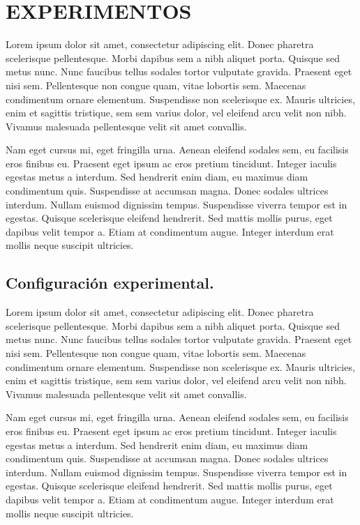 \section{EXPERIMENTOS}
Lorem ipsum dolor sit amet, consectetur adipiscing elit. Donec pharetra scelerisque pellentesque. Morbi dapibus sem a nibh aliquet porta. Quisque sed metus nunc. Nunc faucibus tellus sodales tortor vulputate gravida. Praesent eget nisi sem. Pellentesque non congue quam, vitae lobortis sem. Maecenas condimentum ornare elementum. Suspendisse non scelerisque ex. Mauris ultricies, enim et sagittis tristique, sem sem varius dolor, vel eleifend arcu velit non nibh. Vivamus malesuada pellentesque velit sit amet convallis.

Nam eget cursus mi, eget fringilla urna. Aenean eleifend sodales sem, eu facilisis eros finibus eu. Praesent eget ipsum ac eros pretium tincidunt. Integer iaculis egestas metus a interdum. Sed hendrerit enim diam, eu maximus diam condimentum quis. Suspendisse at accumsan magna. Donec sodales ultrices interdum. Nullam euismod dignissim tempus. Suspendisse viverra tempor est in egestas. Quisque scelerisque eleifend hendrerit. Sed mattis mollis purus, eget dapibus velit tempor a. Etiam at condimentum augue. Integer interdum erat mollis neque suscipit ultricies.



\subsection{Configuración experimental.}

Lorem ipsum dolor sit amet, consectetur adipiscing elit. Donec pharetra scelerisque pellentesque. Morbi dapibus sem a nibh aliquet porta. Quisque sed metus nunc. Nunc faucibus tellus sodales tortor vulputate gravida. Praesent eget nisi sem. Pellentesque non congue quam, vitae lobortis sem. Maecenas condimentum ornare elementum. Suspendisse non scelerisque ex. Mauris ultricies, enim et sagittis tristique, sem sem varius dolor, vel eleifend arcu velit non nibh. Vivamus malesuada pellentesque velit sit amet convallis.

Nam eget cursus mi, eget fringilla urna. Aenean eleifend sodales sem, eu facilisis eros finibus eu. Praesent eget ipsum ac eros pretium tincidunt. Integer iaculis egestas metus a interdum. Sed hendrerit enim diam, eu maximus diam condimentum quis. Suspendisse at accumsan magna. Donec sodales ultrices interdum. Nullam euismod dignissim tempus. Suspendisse viverra tempor est in egestas. Quisque scelerisque eleifend hendrerit. Sed mattis mollis purus, eget dapibus velit tempor a. Etiam at condimentum augue. Integer interdum erat mollis neque suscipit ultricies.
